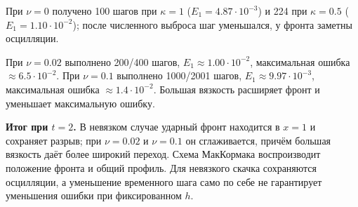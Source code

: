 \documentclass[11pt,a4paper]{article}
\begin{document}
При $\nu=0$ получено 100 шагов при $\kappa=1$ ($E_1=4.87\cdot10^{-3}$) и 224 при $\kappa=0.5$ ($E_1=1.10\cdot10^{-2}$); после численного выброса шаг уменьшался, у фронта заметны осцилляции.

При $\nu=0.02$ выполнено 200/400 шагов, $E_1\approx1.00\cdot10^{-2}$, максимальная ошибка $\approx6.5\cdot10^{-2}$. При $\nu=0.1$ выполнено 1000/2001 шагов, $E_1\approx9.97\cdot10^{-3}$, максимальная ошибка $\approx1.4\cdot10^{-2}$. Большая вязкость расширяет фронт и уменьшает максимальную ошибку.

\begin{answerbox}
\textbf{Итог при $t=2$.} В невязком случае ударный фронт находится в $x=1$ и сохраняет разрыв; при $\nu=0.02$ и $\nu=0.1$ он сглаживается, причём большая вязкость даёт более широкий переход. Схема МакКормака воспроизводит положение фронта и общий профиль. Для невязкого скачка сохраняются осцилляции, а уменьшение временного шага само по себе не гарантирует уменьшения ошибки при фиксированном $h$.
\end{answerbox}
\end{document}
